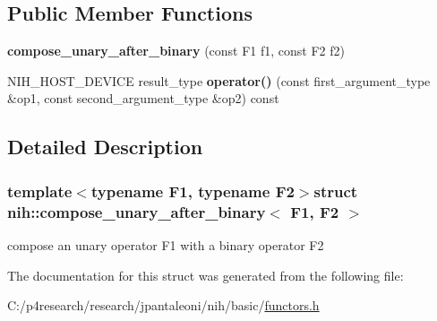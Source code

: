 \subsection*{\-Public \-Member \-Functions}
\begin{DoxyCompactItemize}
\item 
\hypertarget{structnih_1_1compose__unary__after__binary_a8bdc589f4c04a452d1dd360f151c411c}{
{\bfseries compose\-\_\-unary\-\_\-after\-\_\-binary} (const \-F1 f1, const \-F2 f2)}
\label{structnih_1_1compose__unary__after__binary_a8bdc589f4c04a452d1dd360f151c411c}

\item 
\hypertarget{structnih_1_1compose__unary__after__binary_a2540b806addadf1811a52b8f97590ed2}{
\-N\-I\-H\-\_\-\-H\-O\-S\-T\-\_\-\-D\-E\-V\-I\-C\-E result\-\_\-type {\bfseries operator()} (const first\-\_\-argument\-\_\-type \&op1, const second\-\_\-argument\-\_\-type \&op2) const }
\label{structnih_1_1compose__unary__after__binary_a2540b806addadf1811a52b8f97590ed2}

\end{DoxyCompactItemize}


\subsection{\-Detailed \-Description}
\subsubsection*{template$<$typename F1, typename F2$>$struct nih\-::compose\-\_\-unary\-\_\-after\-\_\-binary$<$ F1, F2 $>$}

compose an unary operator \-F1 with a binary operator \-F2 

\-The documentation for this struct was generated from the following file\-:\begin{DoxyCompactItemize}
\item 
\-C\-:/p4research/research/jpantaleoni/nih/basic/\hyperlink{functors_8h}{functors.\-h}\end{DoxyCompactItemize}
